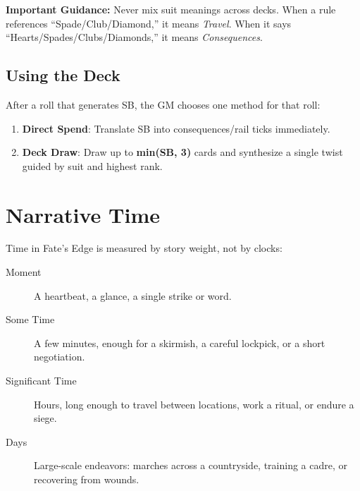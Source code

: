 \textbf{Important Guidance:} Never mix suit meanings across decks. When a rule references ``Spade/Club/Diamond,'' it means \emph{Travel}. When it says ``Hearts/Spades/Clubs/Diamonds,'' it means \emph{Consequences}.

\subsection*{Using the Deck}

After a roll that generates SB, the GM chooses one method for that roll:
\begin{enumerate}
  \item \textbf{Direct Spend}: Translate SB into consequences/rail ticks immediately.
  \item \textbf{Deck Draw}: Draw up to \textbf{min(SB, 3)} cards and synthesize a single twist guided by suit and highest rank.
\end{enumerate}

\section{Narrative Time}

Time in Fate's Edge is measured by story weight, not by clocks:
\begin{description}
  \item[Moment]  A heartbeat, a glance, a single strike or word.
  \item[Some Time]  A few minutes, enough for a skirmish, a careful lockpick, or a short negotiation.
  \item[Significant Time]  Hours, long enough to travel between locations, work a ritual, or endure a siege.
  \item[Days]  Large-scale endeavors: marches across a countryside, training a cadre, or recovering from wounds.
\end{description}

